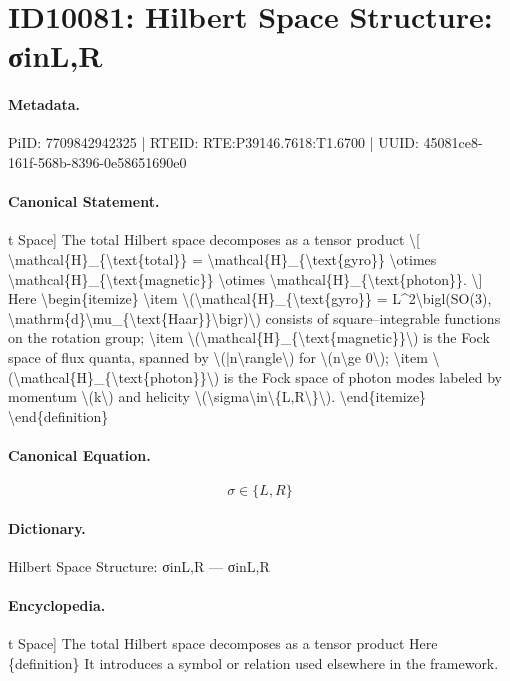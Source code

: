 \section*{ID10081: Hilbert Space Structure: σinL,R}
\paragraph{Metadata.}
PiID: 7709842942325 | RTEID: RTE:P39146.7618:T1.6700 | UUID: 45081ce8-161f-568b-8396-0e58651690e0

\paragraph{Canonical Statement.}
t Space] The total Hilbert space decomposes as a tensor product \textbackslash{}[ \textbackslash{}mathcal\{H\}\_\{\textbackslash{}text\{total\}\} = \textbackslash{}mathcal\{H\}\_\{\textbackslash{}text\{gyro\}\} \textbackslash{}otimes \textbackslash{}mathcal\{H\}\_\{\textbackslash{}text\{magnetic\}\} \textbackslash{}otimes \textbackslash{}mathcal\{H\}\_\{\textbackslash{}text\{photon\}\}. \textbackslash{}] Here \textbackslash{}begin\{itemize\} \textbackslash{}item \textbackslash{}(\textbackslash{}mathcal\{H\}\_\{\textbackslash{}text\{gyro\}\} = L\textasciicircum{}2\textbackslash{}bigl(SO(3), \textbackslash{}mathrm\{d\}\textbackslash{}mu\_\{\textbackslash{}text\{Haar\}\}\textbackslash{}bigr)\textbackslash{}) consists of square–integrable functions on the rotation group; \textbackslash{}item \textbackslash{}(\textbackslash{}mathcal\{H\}\_\{\textbackslash{}text\{magnetic\}\}\textbackslash{}) is the Fock space of flux quanta, spanned by \textbackslash{}(|n\textbackslash{}rangle\textbackslash{}) for \textbackslash{}(n\textbackslash{}ge 0\textbackslash{}); \textbackslash{}item \textbackslash{}(\textbackslash{}mathcal\{H\}\_\{\textbackslash{}text\{photon\}\}\textbackslash{}) is the Fock space of photon modes labeled by momentum \textbackslash{}(k\textbackslash{}) and helicity \textbackslash{}(\textbackslash{}sigma\textbackslash{}in\textbackslash{}\{L,R\textbackslash{}\}\textbackslash{}). \textbackslash{}end\{itemize\} \textbackslash{}end\{definition\}

\paragraph{Canonical Equation.}
\[
\sigma\in\{L,R\}
\]

\paragraph{Dictionary.}
Hilbert Space Structure: σinL,R — σinL,R

\paragraph{Encyclopedia.}
t Space] The total Hilbert space decomposes as a tensor product Here \{definition\} It introduces a symbol or relation used elsewhere in the framework.
